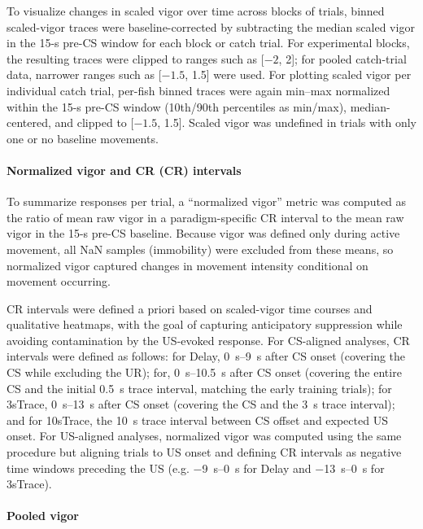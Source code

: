 To visualize changes in scaled vigor over time across blocks of trials, binned scaled-vigor traces were baseline-corrected by subtracting the median scaled vigor in the 15-s pre-CS window for each block or catch trial. For experimental blocks, the resulting traces were clipped to ranges such as [$-2$, 2]; for pooled catch-trial data, narrower ranges such as [$-1.5$, 1.5] were used. For plotting scaled vigor per individual catch trial, per-fish binned traces were again min--max normalized within the 15-s pre-CS window (10th/90th percentiles as min/max), median-centered, and clipped to [$-1.5$, 1.5]. Scaled vigor was undefined in trials with only one or no baseline movements.

\paragraph{Normalized vigor and CR (CR) intervals}

To summarize responses per trial, a ``normalized vigor'' metric was computed as the ratio of mean raw vigor in a paradigm-specific CR interval to the mean raw vigor in the 15-s pre-CS baseline. Because vigor was defined only during active movement, all NaN samples (immobility) were excluded from these means, so normalized vigor captured changes in movement intensity conditional on movement occurring.

CR intervals were defined a priori based on scaled-vigor time courses and qualitative heatmaps, with the goal of capturing anticipatory suppression while avoiding contamination by the US-evoked response. For CS-aligned analyses, CR intervals were defined as follows: for Delay, \SIrange{0}{9}{\second} after CS onset (covering the CS while excluding the UR); for, \SIrange{0}{10.5}{\second} after CS onset (covering the entire CS and the initial \SI{0.5}{\second} trace interval, matching the early training trials); for 3sTrace, \SIrange{0}{13}{\second} after CS onset (covering the CS and the \SI{3}{\second} trace interval); and for 10sTrace, the \SI{10}{\second} trace interval between CS offset and expected US onset. For US-aligned analyses, normalized vigor was computed using the same procedure but aligning trials to US onset and defining CR intervals as negative time windows preceding the US (e.g. \SIrange{-9}{0}{\second} for Delay and \SIrange{-13}{0}{\second} for 3sTrace).

\paragraph{Pooled vigor}

